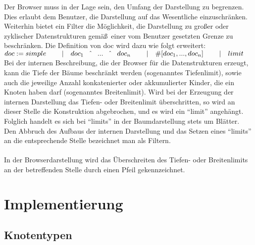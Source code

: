\documentclass[12pt,a4paper]{article}
\begin{document}
Der Browser muss in der Lage sein, den Umfang  der Darstellung zu begrenzen. 
Dies erlaubt dem Benutzer, die Darstellung auf das Wesentliche 
einzuschr\"{a}nken. Weiterhin bietet ein Filter die M\"{o}glichkeit, 
die Darstellung zu gro\ss er oder zyklischer Datenstrukturen 
gem\"{a}\ss \, einer vom Benutzer gesetzten Grenze zu beschr\"anken. 
Die Definition von doc wird dazu wie folgt erweitert: \\[2mm]
\begin{math}
doc :=  simple \\  
\hspace*{8mm} | \quad  doc_{1} \quad \hat{} \quad ... \quad \hat{} 
                \quad  doc_{n} \\         
\hspace*{8mm} | \quad  
\# \lbrack doc_{1}, ... , doc_{n}\rbrack \\
\hspace*{8mm} | \quad limit 
\\[2mm]
\end{math}
Bei der internen Beschreibung, die der Browser f\"ur die 
Datenstrukturen erzeugt, kann die Tiefe der B\"aume beschr\"ankt werden 
(sogenanntes Tiefenlimit), sowie auch die jeweilige 
Anzahl konkatenierter oder akkumulierter Kinder, die ein Knoten haben 
darf (sogenanntes Breitenlimit). Wird bei der Erzeugung der internen 
Darstellung das Tiefen- oder Breitenlimit \"uberschritten, so wird an 
dieser Stelle die Konstruktion abgebrochen, und es wird ein ``limit'' 
angeh\"angt. Folglich handelt es sich bei ``limits'' in der Baumdarstellung 
stets um Bl\"atter. Den Abbruch des Aufbaus der internen Darstellung und 
das Setzen eines ``limits'' an die entsprechende Stelle bezeichnet man 
als Filtern. 

\paragraph{}

In der Browserdarstellung wird das \"Uberschreiten des
Tiefen- oder Breitenlimits an der betreffenden Stelle durch einen Pfeil
gekennzeichnet. 



\section{Implementierung}

\subsection{Knotentypen}
\end{document}
